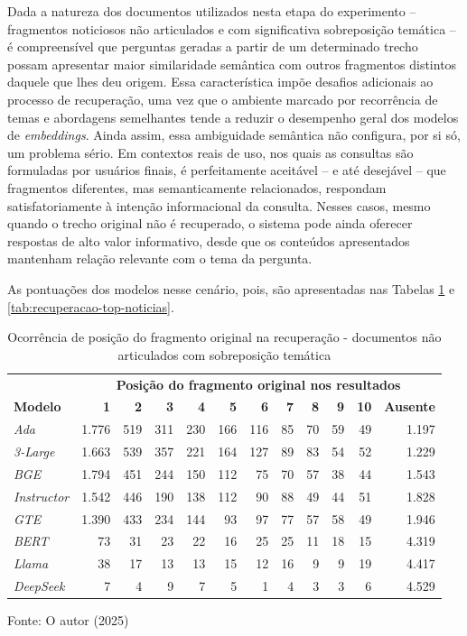 Dada a natureza dos documentos utilizados nesta etapa do experimento -- fragmentos noticiosos não articulados e com significativa sobreposição temática -- é compreensível que perguntas geradas a partir de um determinado trecho possam apresentar maior similaridade semântica com outros fragmentos distintos daquele que lhes deu origem. Essa característica impõe desafios adicionais ao processo de recuperação, uma vez que o ambiente marcado por recorrência de temas e abordagens semelhantes tende a reduzir o desempenho geral dos modelos de \textit{embeddings}. Ainda assim, essa ambiguidade semântica não configura, por si só, um problema sério. Em contextos reais de uso, nos quais as consultas são formuladas por usuários finais, é perfeitamente aceitável -- e até desejável -- que fragmentos diferentes, mas semanticamente relacionados, respondam satisfatoriamente à intenção informacional da consulta. Nesses casos, mesmo quando o trecho original não é recuperado, o sistema pode ainda oferecer respostas de alto valor informativo, desde que os conteúdos apresentados mantenham relação relevante com o tema da pergunta.

As pontuações dos modelos nesse cenário, pois, são apresentadas nas Tabelas \ref{tab:recuperacao-rank-noticias} e \ref{tab:recuperacao-top-noticias}.


\begin{table}[H]
    \caption{Ocorrência de posição do fragmento original na recuperação - documentos não articulados com sobreposição temática}
    \centering
    \begin{tabular}{ l r r r r r r r r r r r }
        \hline
            & \multicolumn{11}{c}{\textbf{Posição do fragmento original nos resultados}} \\
        \textbf{Modelo} & \textbf{1} & \textbf{2} & \textbf{3} & \textbf{4} & \textbf{5} & \textbf{6} & \textbf{7} & \textbf{8} & \textbf{9} & \textbf{10} & \textbf{Ausente} \\  
        \hline
        \textit{Ada} & 1.776 & 519 & 311 & 230 & 166 & 116 & 85 & 70 & 59 & 49 & 1.197 \\
        \textit{3-Large} & 1.663 & 539 & 357 & 221 & 164 & 127 & 89 & 83 & 54 & 52 & 1.229 \\
        \textit{BGE} & 1.794 & 451 & 244 & 150 & 112 & 75 & 70 & 57 & 38 & 44 & 1.543 \\
        \textit{Instructor} & 1.542 & 446 & 190 & 138 & 112 & 90 & 88 & 49 & 44 & 51 & 1.828 \\
        \textit{GTE} & 1.390 & 433 & 234 & 144 & 93 & 97 & 77 & 57 & 58 & 49 & 1.946 \\
        \textit{BERT} & 73 & 31 & 23 & 22 & 16 & 25 & 25 & 11 & 18 & 15 & 4.319 \\
        \textit{Llama} & 38 & 17 & 13 & 13 & 15 & 12 & 16 & 9 & 9 & 19 & 4.417 \\
        \textit{DeepSeek} & 7 & 4 & 9 & 7 & 5 & 1 & 4 & 3 & 3 & 6 & 4.529 \\
        \hline
    \end{tabular}
    
    Fonte: O autor (2025)
    \label{tab:recuperacao-rank-noticias}
\end{table}

